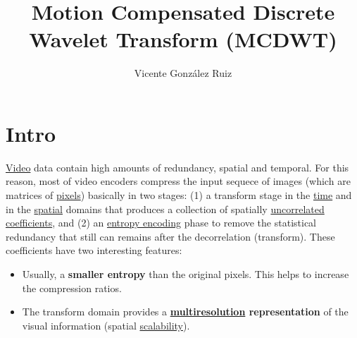 
\title{Motion Compensated Discrete Wavelet Transform (MCDWT)}

\author{Vicente González Ruiz}

\maketitle
\tableofcontents

\section{Intro}

\href{https://en.wikipedia.org/wiki/Video}{Video} data contain high
amounts of redundancy, spatial and temporal. For this reason, most of
video encoders compress the input sequece of images (which are
matrices of \href{https://en.wikipedia.org/wiki/Pixel}{pixels})
basically in two stages: (1) a transform stage in the
\href{https://en.wikipedia.org/wiki/Time_domain}{time} and in the
\href{https://www.quora.com/What-is-spatial-domain-in-image-processing}{spatial}
domains that produces a collection of spatially
\href{https://en.wikipedia.org/wiki/Decorrelation}{uncorrelated}
\href{https://www.quora.com/What-is-spatial-domain-in-image-processing}{coefficients},
and (2) an
\href{https://vicente-gonzalez-ruiz.github.io/symbol_compression/}{entropy
  encoding} phase to remove the statistical redundancy that still can
remains after the decorrelation (transform). These coefficients have
two interesting features:
\begin{itemize}
\item Usually, a \textbf{smaller entropy} than the original
  pixels. This helps to increase the compression ratios.
\item The transform domain provides a
  \textbf{\href{https://en.wikipedia.org/wiki/Image_resolution}{multiresolution}
    representation} of the visual information (spatial
  \href{http://inst.eecs.berkeley.edu/~ee290t/sp04/lectures/videowavelet_UCB1-3.pdf}{scalability}).
\end{itemize}

